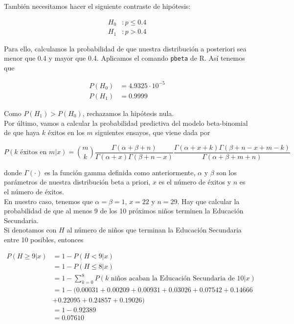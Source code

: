 \documentclass[12pt,a4paper,twoside,openright,titlepage,final]{article}
\begin{document}
También necesitamos hacer el siguiente contraste de hipótesis:

\begin{align*}
H_0 & : p \leq 0.4 \\
H_1 & : p > 0.4
\end{align*}

Para ello, calculamos la probabilidad de que nuestra distribución a posteriori sea menor que 0.4 y mayor que 0.4. Aplicamos el comando \texttt{pbeta} de R. Así tenemos que

\begin{align*}
P(H_0) & = 4.9325 \cdot 10^{-5} \\
P(H_1) & = 0.9999
\end{align*}

Como $P(H_1) > P(H_0)$, rechazamos la hipótesis nula.\\

Por último, vamos a calcular la probabilidad predictiva del modelo beta-binomial de que haya $k$ éxitos en los $m$ siguientes ensayos, que viene dada por

\begin{equation*}
P(k \text{ éxitos en } m | x) = \binom{m}{k} \dfrac{\Gamma(\alpha + \beta + n)}{\Gamma(\alpha + x) \Gamma(\beta + n - x)} \dfrac{\Gamma(\alpha + x + k) \Gamma(\beta + n - x + m - k)}{\Gamma(\alpha + \beta + m + n)}
\end{equation*}

donde $\Gamma(\cdot)$ es la función gamma definida como anteriormente, $\alpha$ y $\beta$ son los parámetros de nuestra distribución beta a priori, $x$ es el número de éxitos y $n$ es el número de éxitos.\\

En nuestro caso, tenemos que $\alpha = \beta = 1$, $x = 22$ y $n = 29$. Hay que calcular la probabilidad de que al menos 9 de los 10 próximos niños terminen la Educación Secundaria.\\

Si denotamos con $H$ al número de niños que terminan la Educación Secundaria entre 10 posibles, entonces

\begin{align*}
P(H \geq 9 | x) & = 1 - P(H < 9 | x) \\ & = 1 - P(H \leq 8 | x) \\ & = 1 - \sum_{k=0}^{8} P(k \text{ niños acaban la Educación Secundaria de } 10 | x) \\ & = 1 - (0.00031 + 0.00209 + 0.00931 + 0.03026 + 0.07542 + 0.14666 \\ & + 0.22095 + 0.24857 + 0.19026) \\ & = 1 - 0.92389 \\ & = 0.07610
\end{align*}
\end{document}
